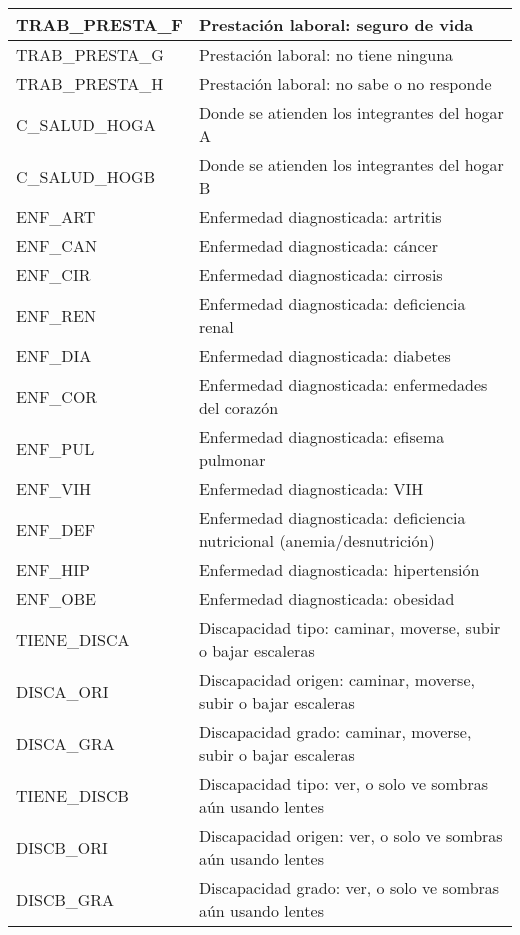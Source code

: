 \begin{longtable}{|p{8cm}|p{8cm}|}
    \hline
    TRAB\_PRESTA\_F & Prestación laboral: seguro de vida \\
    \hline
    TRAB\_PRESTA\_G & Prestación laboral: no tiene ninguna \\
    \hline
    TRAB\_PRESTA\_H & Prestación laboral: no sabe o no responde \\
    \hline
    C\_SALUD\_HOGA & Donde se atienden los integrantes del hogar A \\
    \hline
    C\_SALUD\_HOGB & Donde se atienden los integrantes del hogar B \\
    \hline
    ENF\_ART & Enfermedad diagnosticada: artritis \\
    \hline
    ENF\_CAN & Enfermedad diagnosticada: cáncer \\
    \hline
    ENF\_CIR & Enfermedad diagnosticada: cirrosis \\
    \hline
    ENF\_REN & Enfermedad diagnosticada: deficiencia renal \\
    \hline
    ENF\_DIA & Enfermedad diagnosticada: diabetes \\
    \hline
    ENF\_COR & Enfermedad diagnosticada: enfermedades del corazón \\
    \hline
    ENF\_PUL & Enfermedad diagnosticada: efisema pulmonar \\
    \hline
    ENF\_VIH & Enfermedad diagnosticada: VIH \\
    \hline
    ENF\_DEF & Enfermedad diagnosticada: deficiencia nutricional (anemia/desnutrición) \\
    \hline
    ENF\_HIP & Enfermedad diagnosticada: hipertensión \\
    \hline
    ENF\_OBE & Enfermedad diagnosticada: obesidad \\
    \hline
    TIENE\_DISCA & Discapacidad tipo: caminar, moverse, subir o bajar escaleras \\
    \hline
    DISCA\_ORI & Discapacidad origen: caminar, moverse, subir o bajar escaleras  \\
    \hline
    DISCA\_GRA & Discapacidad grado:  caminar, moverse, subir o bajar escaleras \\
    \hline
    TIENE\_DISCB & Discapacidad tipo: ver, o solo ve sombras aún usando lentes \\
    \hline
    DISCB\_ORI & Discapacidad origen: ver, o solo ve sombras aún usando lentes \\
    \hline
    DISCB\_GRA & Discapacidad grado: ver, o solo ve sombras aún usando lentes \\
    \hline

\end{longtable}
